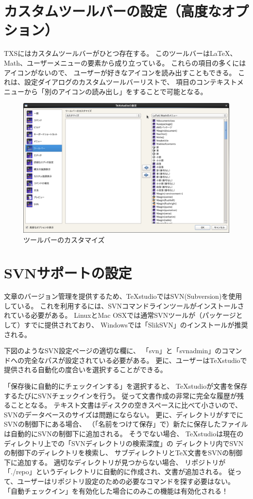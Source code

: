 \section{カスタムツールバーの設定（高度なオプション）}

TXSにはカスタムツールバーがひとつ存在する。
このツールバーはLaTeX、Math、ユーザーメニューの要素から成り立っている。
これらの項目の多くにはアイコンがないので、
ユーザーが好きなアイコンを読み出すこともできる。
これは、設定ダイアログのカスタムツールバーリストで、
項目のコンテキストメニューから「別のアイコンの読み出し」をすることで可能となる。

\begin{figure}[H]
  \centering
  \includegraphics[width=.8\linewidth]{configure_customToolbar.png}
  \caption{ツールバーのカスタマイズ}
\end{figure}

\section{SVNサポートの設定}\label{sec:config_svn}

文章のバージョン管理を提供するため、TeXstudioではSVN(Subversion)を使用している。
これを利用するには、SVNコマンドラインツールがインストールされている必要がある。
LinuxとMac OSXでは通常SVNツールが（パッケージとして）すでに提供されており、
Windowsでは「SlikSVN」のインストールが推奨される。

下図のようなSVN設定ページの適切な欄に、
「svn」と「svnadmin」のコマンドへの完全なパスが設定されている必要がある。
更に、ユーザーはTeXstudioで提供される自動化の度合いを選択することができる。

「保存後に自動的にチェックインする」を選択すると、
TeXstudioが文書を保存するたびにSVNチェックインを行う。
従って文書作成の非常に完全な履歴が残ることとなる。
テキスト文書はディスクの空きスペースに比べて小さいので、
SVNのデータベースのサイズは問題にならない。
更に、ディレクトリがすでにSVNの制御下にある場合、
（「名前をつけて保存」で）新たに保存したファイルは自動的にSVNの制御下に追加される。
そうでない場合、
TeXstudioは現在のディレクトリ上での「SVNディレクトリの検索深度」の
ディレクトリ内でSVNの制御下のディレクトリを検索し、
サブディレクトリとTeX文書をSVNの制御下に追加する。
適切なディレクトリが見つからない場合、
リポジトリが「./repo」というディレクトリに自動的に作成され、文書が追加される。
従って、ユーザーはリポジトリ設定のための必要なコマンドを探す必要はない。
「自動チェックイン」を有効化した場合にのみこの機能は有効化される！

